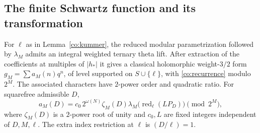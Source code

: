 \subsection{The finite Schwartz function and its transformation}

\begin{lemma}\label{co:theta-bridge}
For $\ell$ as in Lemma~\ref{co:kummer}, the reduced modular
parametrization followed by $\lambda_M$ admits an integral weighted
ternary theta lift.  After extraction of the coefficients at multiples
of $|h_*|$ it gives a classical holomorphic weight-$3/2$ form
$g_M=\sum a_M(n)q^n$, of level supported on $S\cup\{\ell\}$, with
\eqref{co:recurrence} modulo $2^M$.  The associated characters have
$2$-power order and quadratic ratio.  For squarefree admissible $D$,
\begin{equation}\label{co:weighted-comparison}
 a_M(D)=c_0\,2^{\omega(N)}\zeta_M(D)
       \lambda_M\bigl(\operatorname{red}_\ell(LP_D)\bigr)
                     \pmod {2^M},
\end{equation}
where $\zeta_M(D)$ is a $2$-power root of unity and $c_0,L$ are fixed
integers independent of $D,M,\ell$.  The extra index restriction at
$\ell$ is $(D/\ell)=1$.
\end{lemma}

